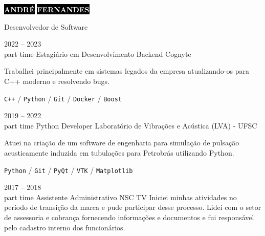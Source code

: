 \documentclass[11pt]{developercv} %
\begin{document}

\begin{minipage}[t]{0.45\textwidth} %
	\vspace{-\baselineskip} %
	
	\colorbox{black}{{\HUGE\textcolor{white}{\textbf{\MakeUppercase{André}}}}} %
	\colorbox{black}{{\HUGE\textcolor{white}{\textbf{\MakeUppercase{Fernandes}}}}} %
	\vspace{6pt}
 
	{\fontsize{15}{15} \selectfont Desenvolvedor de Software} %
 
\end{minipage}
\hfill
\begin{minipage}[t]{0.275\textwidth} %
	
 
 
\end{minipage}

\vspace{0.5cm}




\begin{entrylist}
	\entry
		{2022 -- 2023 \\ \footnotesize{part time}}
		{Estagiário em Desenvolvimento Backend}
		{Cognyte}
		{
			Trabalhei principalmente em sistemas legados da empresa atualizando-os para C++ moderno e resolvendo bugs.
            
            \texttt{C++} / \texttt{Python} / \texttt{Git} / \texttt{Docker} / \texttt{Boost}
        }
	\entry
		{2019 -- 2022\\\footnotesize{part time}}
		{Python Developer}
		{Laboratório de Vibrações e Acústica (LVA) - UFSC}
		{
			Atuei na criação de um software de engenharia para simulação de pulsação acusticamente induzida em tubulações para Petrobrás utilizando Python. 
			
            \texttt{Python} / \texttt{Git} / \texttt{PyQt} / \texttt{VTK} / \texttt{Matplotlib}
        }
	\entry
		{2017 -- 2018 \\ \footnotesize{part time}}
		{Assistente Administrativo}
		{NSC TV}
		{
			Iniciei minhas atividades no período de transição da marca e pude participar desse processo.
			Lidei com o setor de assessoria e cobrança fornecendo informações e documentos e fui responsável pelo cadastro interno dos funcionários.
        }
\end{entrylist}
\end{document}
